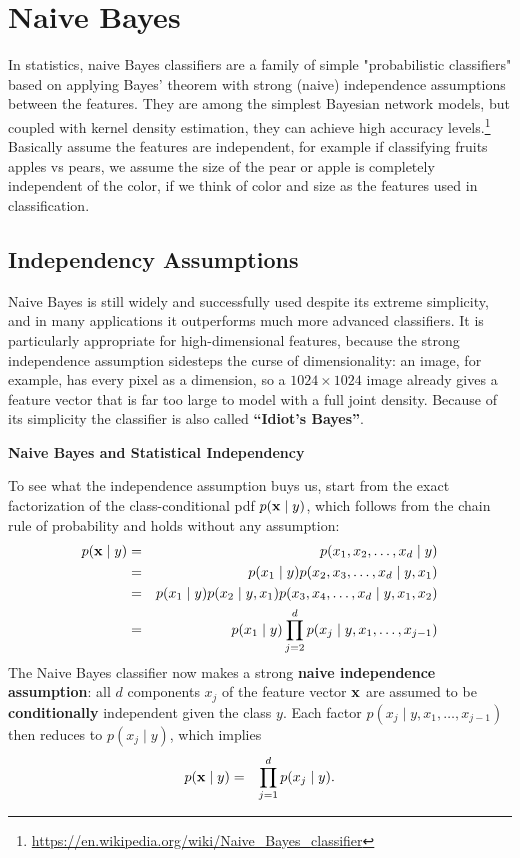   
\section{Naive Bayes}

In statistics, naive Bayes classifiers are a family of simple "probabilistic classifiers" based on applying Bayes' theorem with strong (naive) independence assumptions between the features. They are among the simplest Bayesian network models, but coupled with kernel density estimation, they can achieve high accuracy levels.\footnote{\url{https://en.wikipedia.org/wiki/Naive_Bayes_classifier}} Basically assume the features are independent, for example if classifying fruits apples vs pears, we assume the size of the pear or apple is completely independent of the color, if we think of color and size as the features used in classification.\autocite{hastie2009,bishop2006}

\subsection{Independency Assumptions}

Naive Bayes is still widely and successfully used despite its extreme simplicity, and in many applications it outperforms much more advanced classifiers. It is particularly appropriate for high-dimensional features, because the strong independence assumption sidesteps the curse of dimensionality: an image, for example, has every pixel as a dimension, so a $1024\times1024$ image already gives a feature vector that is far too large to model with a full joint density. Because of its simplicity the classifier is also called \textbf{``Idiot's Bayes''}.

   \textbf{Naive Bayes and Statistical Independency}

  To see what the independence assumption buys us, start from the exact factorization of the class-conditional pdf $p(\bm{\mathrm{x}}\mid y)$, which follows from the chain rule of probability and holds without any assumption:
%
  \begin{eqnarray*}
    p(\bm{\mathrm{x}}\mid y) &=& p(x_1, x_2, \dots, x_d \mid y) \\
    &=& p(x_1\mid y)p(x_2, x_3,\dots, x_d \mid y, x_1) \\
    &=& p(x_1\mid y)p(x_2\mid y,x_1)p(x_3,x_4,\dots, x_d \mid y, x_1, x_2) \\
    &=& p(x_1\mid y)\prod_{j=2}^d p(x_j\mid y, x_1,\dots,x_{j-1})
  \end{eqnarray*} 
  The Naive Bayes classifier now makes a strong \textbf{naive independence assumption}: all $d$ components $x_j$ of the feature vector $\bm{\mathrm{x}}$ are assumed to be \textbf{conditionally} independent given the class $y$. Each factor $p(x_j\mid y, x_1,\dots,x_{j-1})$ then reduces to $p(x_j\mid y)$, which implies
      \begin{eqnarray*}
        p(\bm{\mathrm{x}}\mid y) &=& \prod_{j=1}^d p(x_j\mid y).
      \end{eqnarray*}

